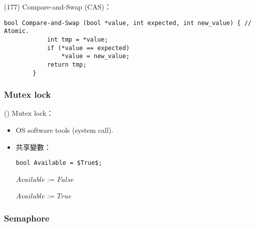 \begin{theorem}{(177)} Compare-and-Swap (CAS)：
    \begin{lstlisting}[caption={\textsc{Compare-and-Swap}.}, captionpos=b, label=algo:comp-and-swap]
        bool Compare-and-Swap (bool *value, int expected, int new_value) { // Atomic.
            int tmp = *value;
            if (*value == expected)
                *value = new_value;
            return tmp;
        }
    \end{lstlisting}
\end{theorem}

\subsubsection{Mutex lock}

\begin{theorem}{()} Mutex lock：\begin{itemize}
        \item OS software tools (system call).
        \item 共享變數：\begin{lstlisting}[caption={Shared variables of Mutex lock.}, captionpos=b, mathescape=true]
            bool Available = $True$;
        \end{lstlisting}
        \begin{algorithm}[H]
            \caption{$acquire()$.}
            \begin{algorithmic}[1]
                    \EndWhile
                    \State $Available$ := $False$
                \EndFunction
            \end{algorithmic}
        \end{algorithm}
        \begin{algorithm}[H]
            \caption{$release()$.}
            \begin{algorithmic}[1]
                    \State $Available$ := $True$
                \EndFunction
            \end{algorithmic}
        \end{algorithm}
    \end{itemize}
\end{theorem}

\subsubsection{Semaphore}

